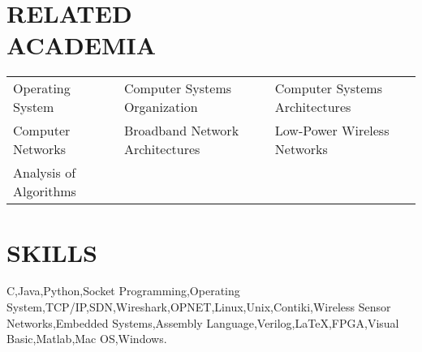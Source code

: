\documentclass[margin,line]{resume}
\begin{document}
\begin{resume}
\sectionline

    \section{\mysidestyle \textbf{\large{R}\small{ELATED\\ACADEMIA}}} 

	\vspace{1mm} %
	\begin{tabular}{@{}p{4cm}p{5.5cm}p{5.5cm}}
	Operating System     &  Computer Systems Organization        &  Computer Systems Architectures\\
	Computer Networks    &  Broadband Network Architectures      &  Low-Power Wireless Networks\\
	Analysis of Algorithms %
	\end{tabular}

\sectionline

    \section{\mysidestyle \textbf{\large{S}\small{KILLS}}}

    C,\hspace{2mm}Java,\hspace{2mm}Python,\hspace{2mm}Socket Programming,\hspace{2mm}Operating System,\hspace{2mm}TCP/IP,\hspace{2mm}SDN,\hspace{2mm}Wireshark,\hspace{2mm}OPNET,\hspace{2mm}Linux,\hspace{2mm}Unix,\hspace{2mm}Contiki,\hspace{2mm}Wireless Sensor Networks,\hspace{2mm}Embedded Systems,\hspace{2mm}Assembly Language,\hspace{2mm}Verilog,\hspace{2mm}\LaTeX,\hspace{2mm}FPGA,\hspace{2mm}Visual Basic,\hspace{2mm}Matlab,\hspace{2mm}Mac OS,\hspace{2mm}Windows.


\end{resume}
\end{document}
